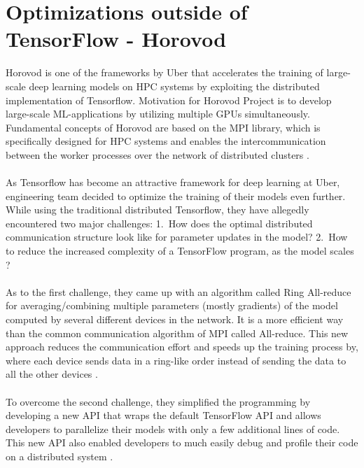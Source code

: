 \documentclass[ieeetran]{article}
\begin{document}
\section{Optimizations outside of TensorFlow - Horovod} %
\label{sec:optimization_outside_of_tensorFlow}
Horovod is one of the frameworks by Uber that accelerates the training of large-scale deep learning models on HPC systems by exploiting the distributed implementation of Tensorflow. Motivation for Horovod Project is to develop large-scale ML-applications by utilizing multiple GPUs simultaneously. Fundamental concepts of Horovod are based on the MPI library, which is specifically designed for HPC systems and enables the intercommunication between the worker processes over the network of distributed clusters \cite{sixth}.
\\ \\As Tensorflow has become an attractive framework for deep learning at Uber, engineering team decided to optimize the training of their models even further. While using the traditional distributed Tensorflow, they have allegedly encountered two major challenges: 1.\ How does the optimal distributed communication structure look like for parameter updates in the model? 2.\ How to reduce the increased complexity of a TensorFlow program, as the model scales \cite{seventh}?
\\ \\As to the first challenge, they came up with an algorithm called Ring All-reduce for averaging/combining multiple parameters (mostly gradients) of the model computed by several different devices in the network. It is a more efficient way than the common communication algorithm of MPI called All-reduce. This new approach reduces the communication effort and speeds up the training process by, where each device sends data in a ring-like order instead of sending the data to all the other devices \cite{sixth} \cite{seventh}.
\\ \\To overcome the second challenge, they simplified the programming by developing a new API that wraps the default TensorFlow API and allows developers to parallelize their models with only a few additional lines of code. This new API also enabled developers to much easily debug and profile their code on a distributed system \cite{seventh}.
\end{document}
